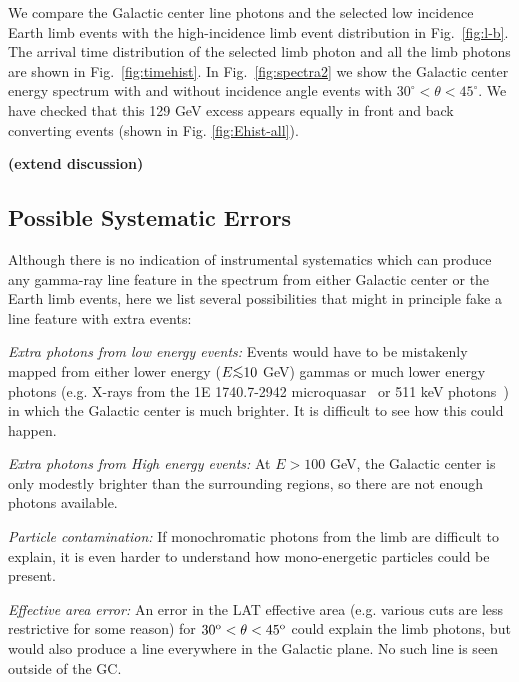 \documentclass[aps,twocolumn,prd,superscriptaddress,showpacs,nofootinbib,fixfloat]{revtex4}
\newcommand{\degree}{^{\rm o}}
\def\la{\vcenter{\hbox{$<$}\offinterlineskip\hbox{$\sim$}}}
\begin{document}
We compare the Galactic center line photons and the selected
low incidence Earth limb events with the high-incidence limb
event distribution in Fig.~\ref{fig:l-b}. The arrival time
distribution of the selected limb photon and all the limb
photons are shown in Fig.~\ref{fig:timehist}. In
Fig.~\ref{fig:spectra2} we show the Galactic center energy
spectrum with and without incidence angle events with
$30^\circ<\theta<45^\circ$.  We have checked that this 129
GeV excess appears equally in front and back converting
events (shown in Fig. \ref{fig:Ehist-all}).

\textbf{(extend discussion)}

\subsection{Possible Systematic Errors}

Although there is no indication of instrumental systematics
which can produce any gamma-ray line feature in the spectrum
from either Galactic center or the Earth limb events, here
we list several possibilities that might in principle fake a
line feature with extra events:

{\it Extra photons from low energy events:} Events would
have to be mistakenly mapped from either lower energy ($E
\la 10$ GeV) gammas or much lower energy photons (e.g.
X-rays from the 1E 1740.7-2942 microquasar~\cite{Gallo:2002}
or 511 keV photons~\cite{Prantzos:2011}) in which the
Galactic center is much brighter.  It is difficult to see
how this could happen.

{\it Extra photons from High energy events:} At $E > 100$
GeV, the Galactic center is only modestly brighter than the
surrounding regions, so there are not enough photons
available.

{\it Particle contamination:} If monochromatic photons from
the limb are difficult to explain, it is even harder to
understand how mono-energetic particles could be present.

{\it Effective area error:} An error in the LAT effective
area (e.g. various cuts are less restrictive for some
reason) for $30\degree < \theta < 45\degree$ could explain
the limb photons, but would also produce a line everywhere
in the Galactic plane.  No such line is seen outside of the
GC.\medskip
\end{document}
